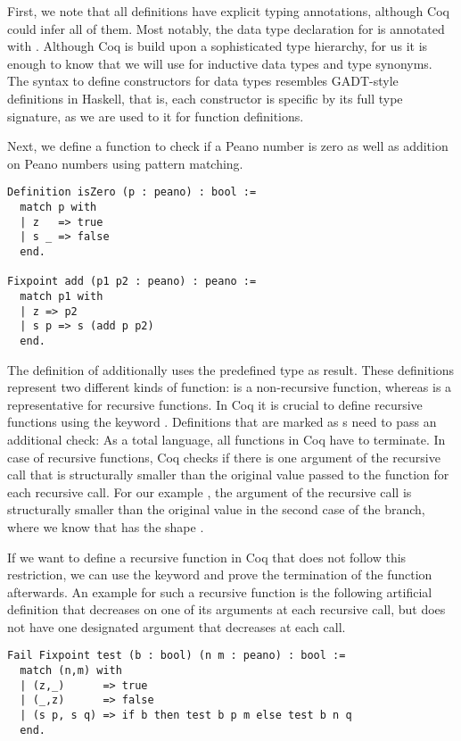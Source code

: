 First, we note that all definitions have explicit typing annotations, although Coq could infer all of them.
Most notably, the data type declaration for  is annotated with .
Although Coq is build upon a sophisticated type hierarchy, for us it is enough to know that we will use  for inductive data types and type synonyms.
The syntax to define constructors for data types resembles GADT-style definitions in Haskell, that is, each constructor is specific by its full type signature, as we are used to it for function definitions.

Next, we define a function to check if a Peano number is zero as well as addition on Peano numbers using pattern matching.

\begin{verbatim}
Definition isZero (p : peano) : bool :=
  match p with
  | z   => true
  | s _ => false
  end.

Fixpoint add (p1 p2 : peano) : peano :=
  match p1 with
  | z => p2
  | s p => s (add p p2)
  end.
\end{verbatim}

The definition of  additionally uses the predefined  type as result.
These definitions represent two different kinds of function:  is a non-recursive function, whereas  is a representative for recursive functions.
In Coq it is crucial to define recursive functions using the keyword .
Definitions that are marked as s need to pass an additional check: As a total language, all functions in Coq have to terminate.
In case of recursive functions, Coq checks if there is one argument of the recursive call that is structurally smaller than the original value passed to the function for each recursive call.
For our example , the argument  of the recursive call is structurally smaller than the original value  in the second case of the branch, where we know that  has the shape .

If we want to define a recursive function in Coq that does not follow this restriction, we can use the keyword  and prove the termination of the function afterwards.
An example for such a recursive function is the following artificial definition that decreases on one of its arguments at each recursive call, but does not have one designated argument that decreases at each call.

\begin{verbatim}
Fail Fixpoint test (b : bool) (n m : peano) : bool :=
  match (n,m) with
  | (z,_)      => true
  | (_,z)      => false
  | (s p, s q) => if b then test b p m else test b n q
  end.
\end{verbatim}


